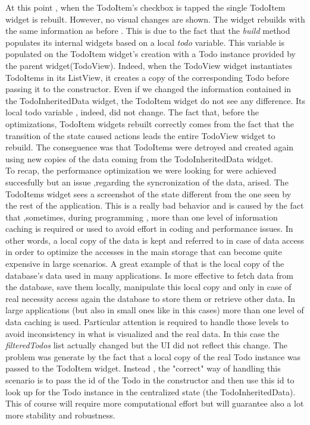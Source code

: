 At this point , when the TodoItem’s checkbox is tapped the single TodoItem widget is rebuilt. However, no visual changes are shown. The widget rebuilds with the same information as before . This is due to the fact that the \textit{build} method populates its internal widgets based on a local \textit{todo} variable. This variable is populated on the TodoItem widget's creation with a Todo instance provided by the parent widget(TodoView). Indeed, when the TodoView widget instantiates TodoItems  in its ListView, it creates a copy of the corresponding Todo before passing it to the constructor. Even if we changed the information contained in the TodoInheritedData widget, the TodoItem widget do not see any difference.  Its local todo variable , indeed, did not change. The fact that, before the optimizations, TodoItem widgets rebuilt correctly comes from the fact that the transition of the state caused actions leads the entire TodoView widget to rebuild. The conseguence was that TodoItems were detroyed and created again using new copies of the data coming from the TodoInheritedData widget. \\
To recap, the performance optimization we were looking for were achieved succesfully but an issue ,regarding the syncronization of the data, arised. The TodoItems widget sees a screenshot of the state different from the one seen by the rest of the application. This is a really bad behavior and is caused by the fact that ,sometimes, during programming , more than one level of information caching is required or used to avoid effort in coding and performance issues. In other words, a local copy of the data is kept and referred to in case of data access in order to optimize the accesses in the main storage that can become quite expensive in large scenarios. A great example of that is the local copy of the database’s data used in many applications. Is more effective to fetch data from the database, save them locally, manipulate this local copy and only in case of real necessity access again the database to store them or retrieve other data. In large applications (but also in small ones like in this cases) more than one level of data caching is used. Particular attention is required to handle those levels to avoid inconsistency in what is visualized and the real data. In this case the \textit{filteredTodos} list actually changed but the UI did not reflect this change. The problem was generate by the fact that a local copy of the real Todo instance was passed to the TodoItem widget. Instead , the "correct" way of handling this scenario is to pass the id of the Todo in the constructor and then use this id to look up for the Todo instance in the centralized state (the TodoInheritedData). This of course will require more computational effort but  will guarantee also a lot more stability and robustness. 
